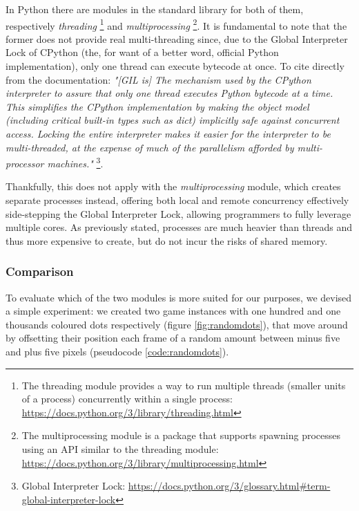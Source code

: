 In Python there are modules in the standard library for both of them, respectively \textit{threading} \footnote{The threading module provides a way to run multiple threads (smaller units of a process) concurrently within a single process: \url{https://docs.python.org/3/library/threading.html}} and \textit{multiprocessing} \footnote{The multiprocessing module is a package that supports spawning processes using an API similar to the threading module: \url{https://docs.python.org/3/library/multiprocessing.html}}. It is fundamental to note that the former does not provide real multi-threading since, due to the Global Interpreter Lock of CPython (the, for want of a better word, official Python implementation), only one thread can execute bytecode at once. To cite directly from the documentation: \textit{"[GIL is] The mechanism used by the CPython interpreter to assure that only one thread executes Python bytecode at a time. This simplifies the CPython implementation by making the object model (including critical built-in types such as dict) implicitly safe against concurrent access. Locking the entire interpreter makes it easier for the interpreter to be multi-threaded, at the expense of much of the parallelism afforded by multi-processor machines."} \footnote{Global Interpreter Lock: \url{https://docs.python.org/3/glossary.html\#term-global-interpreter-lock}}.

Thankfully, this does not apply with the \textit{multiprocessing} module, which creates separate processes instead, offering both local and remote concurrency effectively side-stepping the Global Interpreter Lock, allowing programmers to fully leverage multiple cores. As previously stated, processes are much heavier than threads and thus more expensive to create, but do not incur the risks of shared memory. 

\subsubsection{Comparison}\label{sec:thmpComparison}

To evaluate which of the two modules is more suited for our purposes, we devised a simple experiment: we created two game instances with one hundred and one thousands coloured dots respectively (figure \ref{fig:randomdots}), that move around by offsetting their position each frame of a random amount between minus five and plus five pixels (pseudocode \ref{code:randomdots}).

